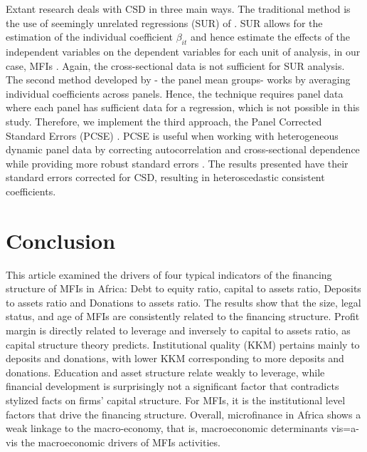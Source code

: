 \documentclass[a4paper, nobind]{templates/ociamthesis}
\begin{document}
Extant research deals with CSD in three main ways. The traditional method is the use of seemingly unrelated regressions (SUR) of \textcite{zellner1962further,arouri2013econometric}. SUR allows for the estimation of the individual coefficient \(\beta_{it}\) and hence estimate the effects of the independent variables on the dependent variables for each unit of analysis, in our case, MFIs \autocite{sarafidis2012cross}. Again, the cross-sectional data is not sufficient for SUR analysis. The second method developed by \textcite{esaran2021general} - the panel mean groups- works by averaging individual coefficients across panels. Hence, the technique requires panel data where each panel has sufficient data for a regression, which is not possible in this study. Therefore, we implement the third approach, the Panel Corrected Standard Errors (PCSE) \autocite{bailey2011implementing,croissant2008panel}. PCSE is useful when working with heterogeneous dynamic panel data by correcting autocorrelation and cross-sectional dependence while providing more robust standard errors \autocite{ikpesu2019growth}. The results presented have their standard errors corrected for CSD, resulting in heteroscedastic consistent coefficients.

\hypertarget{conclusion-3}{%
\section{Conclusion}\label{conclusion-3}}

This article examined the drivers of four typical indicators of the financing structure of MFIs in Africa: Debt to equity ratio, capital to assets ratio, Deposits to assets ratio and Donations to assets ratio. The results show that the size, legal status, and age of MFIs are consistently related to the financing structure. Profit margin is directly related to leverage and inversely to capital to assets ratio, as capital structure theory predicts. Institutional quality (KKM) pertains mainly to deposits and donations, with lower KKM corresponding to more deposits and donations. Education and asset structure relate weakly to leverage, while financial development is surprisingly not a significant factor that contradicts stylized facts on firms' capital structure. For MFIs, it is the institutional level factors that drive the financing structure. Overall, microfinance in Africa shows a weak linkage to the macro-economy, that is, macroeconomic determinants vis=a-vis the macroeconomic drivers of MFIs activities.
\end{document}
